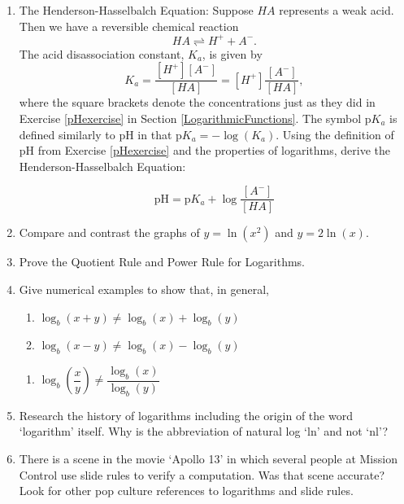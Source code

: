 \documentclass{ximera}
\begin{document}
\begin{enumerate}
\begin{enumerate}
\end{enumerate}   

\item \label{HendersonHasselbalch}  The Henderson-Hasselbalch Equation:  Suppose $HA$ represents a weak acid. Then we have a reversible chemical reaction 
\[HA \rightleftharpoons H^{+} + A^{-}.\]  
The acid disassociation constant, $K_{a}$, is given by 
\[K_{a} = \frac{[H^{+}][A^{-}]}{[HA]} = [H^{+}]\frac{[A^{-}]}{[HA]},\]
where the square brackets denote the concentrations just as they did in Exercise \ref{pHexercise} in Section \ref{LogarithmicFunctions}.  The symbol p$K_{a}$ is defined similarly to pH in that p$K_{a} = -\log(K_{a})$.  Using the definition of pH from Exercise \ref{pHexercise} and the properties of logarithms, derive the Henderson-Hasselbalch Equation:

\[\mbox{pH} = \mbox{p}K_{a} + \log\dfrac{[A^{-}]}{[HA]}\]

\item Compare and contrast the graphs of $y = \ln(x^{2})$ and $y = 2\ln(x)$.

\item Prove the Quotient Rule and Power Rule for Logarithms.

\item Give numerical examples to show that, in general,

\begin{multicols}{2}
\begin{enumerate}

\item $\log_{b}(x + y) \neq \log_{b}(x) + \log_{b}(y)$
\item $\log_{b}(x - y) \neq \log_{b}(x) - \log_{b}(y)$
\setcounter{HWindent}{\value{enumii}}
\end{enumerate}
\end{multicols}

\begin{enumerate}
\setcounter{enumii}{\value{HWindent}}

\item $\log_{b}\left(\dfrac{x}{y}\right) \neq \dfrac{\log_{b}(x)}{\log_{b}(y)}$

\end{enumerate}

\item Research the history of logarithms including the origin of the word `logarithm' itself.  Why is the abbreviation of natural log `ln' and not `nl'?

\item There is a scene in the movie `Apollo 13' in which several people at Mission Control use slide rules to verify a computation.  Was that scene accurate?  Look for other pop culture references to logarithms and slide rules.


\setcounter{HW}{\value{enumi}}
\end{enumerate}
\end{document}
